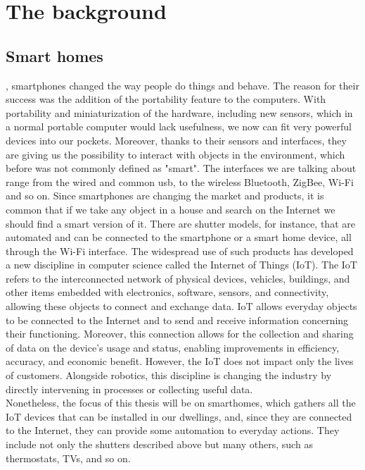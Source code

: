 \chapter{The background}
\label{cap:two}
\section{Smart homes}
, smartphones changed the way people do things and behave. The reason for their success was the addition of the portability feature to the computers. With portability and miniaturization of the hardware, including new sensors, which in a normal portable computer would lack usefulness, we now can fit very powerful devices into our pockets. Moreover, thanks to their sensors and interfaces, they are giving us the possibility to interact with objects in the environment, which before was not commonly defined as "smart". The interfaces we are talking about range from the wired and common \acrshort{usb}, to the wireless Bluetooth, ZigBee, Wi-Fi and so on. 
Since smartphones are changing the market and products, it is common that if we take any object in a house and search on the Internet we should find a smart version of it. There are shutter models, for instance, that are automated and can be connected to the smartphone or a smart home device, all through the Wi-Fi interface.
The widespread use of such products has developed a new discipline in computer science called the Internet of Things (IoT). 
The IoT refers to the interconnected network of physical devices, vehicles, buildings, and other items embedded with electronics, software, sensors, and connectivity, allowing these objects to connect and exchange data. IoT allows everyday objects to be connected to the Internet and to send and receive information concerning their functioning. Moreover, this connection allows for the collection and sharing of data on the device's usage and status, enabling improvements in efficiency, accuracy, and economic benefit. However, the IoT does not impact only the lives of customers. Alongside robotics, this discipline is changing the industry by directly intervening in processes or collecting useful data.
\\ Nonetheless, the focus of this thesis will be on \glspl{smarthome}, which gathers all the IoT devices that can be installed in our dwellings, and, since they are connected to the Internet, they can provide some automation to everyday actions. They include not only the shutters described above but many others, such as thermostats, TVs, and so on. 
